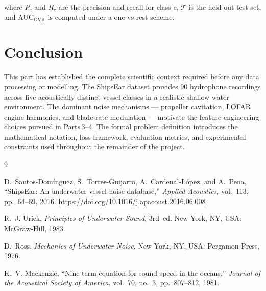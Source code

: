 \documentclass[conference]{IEEEtran}
\begin{document}
where $P_c$ and $R_c$ are the precision and recall for class $c$,
$\mathcal{T}$ is the held-out test set, and AUC$_\mathrm{OVR}$ is computed
under a one-vs-rest scheme.

% 
\section{Conclusion}

This part has established the complete scientific context required before any
data processing or modelling. The ShipsEar dataset provides 90 hydrophone
recordings across five acoustically distinct vessel classes in a realistic
shallow-water environment. The dominant noise mechanisms --- propeller
cavitation, LOFAR engine harmonics, and blade-rate modulation --- motivate the
feature engineering choices pursued in Parts\,3--4. The formal problem
definition introduces the mathematical notation, loss framework, evaluation
metrics, and experimental constraints used throughout the remainder of the
project.

% 
\begin{thebibliography}{9}

D.~Santos-Dom\'inguez, S.~Torres-Guijarro, A.~Cardenal-L\'opez, and A.~Pena,
``ShipsEar: An underwater vessel noise database,''
\textit{Applied Acoustics}, vol.~113, pp.~64--69, 2016.
\url{https://doi.org/10.1016/j.apacoust.2016.06.008}

R.~J. Urick,
\textit{Principles of Underwater Sound}, 3rd~ed.
New York, NY, USA: McGraw-Hill, 1983.

D.~Ross,
\textit{Mechanics of Underwater Noise}.
New York, NY, USA: Pergamon Press, 1976.

K.~V. Mackenzie,
``Nine-term equation for sound speed in the oceans,''
\textit{Journal of the Acoustical Society of America},
vol.~70, no.~3, pp.~807--812, 1981.

\end{thebibliography}
\end{document}
